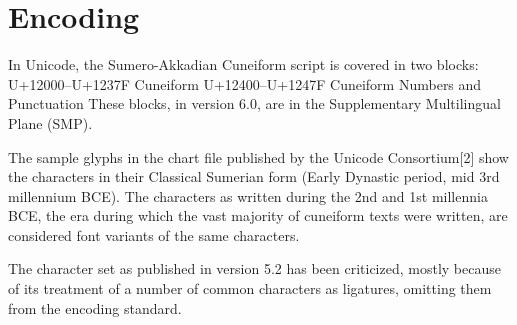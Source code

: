 \section{Encoding}

In Unicode, the Sumero-Akkadian Cuneiform script is covered in two blocks:
U+12000–U+1237F Cuneiform
U+12400–U+1247F Cuneiform Numbers and Punctuation
These blocks, in version 6.0, are in the Supplementary Multilingual Plane (SMP).

The sample glyphs in the chart file published by the Unicode Consortium[2] show the characters in their Classical Sumerian form (Early Dynastic period, mid 3rd millennium BCE). The characters as written during the 2nd and 1st millennia BCE, the era during which the vast majority of cuneiform texts were written, are considered font variants of the same characters.


The character set as published in version 5.2 has been criticized, mostly because of its treatment of a number of common characters as ligatures, omitting them from the encoding standard.




